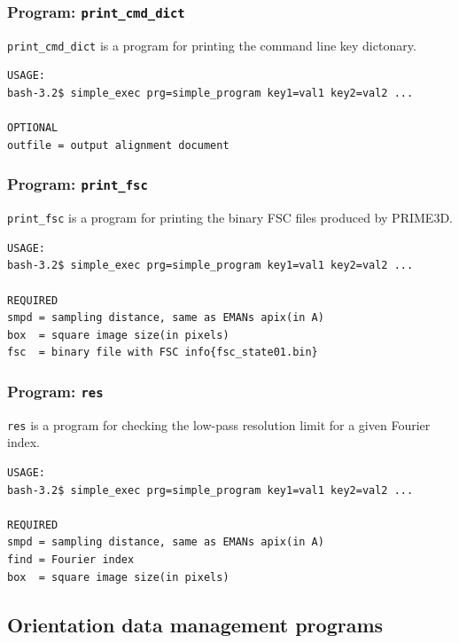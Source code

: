 \documentclass[a4paper,11pt]{article}
\newcommand{\prgname}[1]{\textcolor{NavyBlue}{\texttt{#1}}}
\begin{document}
\subsubsection{Program: \prgname{print\_cmd\_dict}}
\label{print_cmd_dict}
\prgname{print\_cmd\_dict} is a program for printing the command line key dictonary.

\begin{verbatim}
USAGE:
bash-3.2$ simple_exec prg=simple_program key1=val1 key2=val2 ...

OPTIONAL
outfile = output alignment document
\end{verbatim}

\subsubsection{Program: \prgname{print\_fsc}}
\label{print_fsc}
\prgname{print\_fsc} is a program for printing the binary FSC files produced by PRIME3D.

\begin{verbatim}
USAGE:
bash-3.2$ simple_exec prg=simple_program key1=val1 key2=val2 ...

REQUIRED
smpd = sampling distance, same as EMANs apix(in A)
box  = square image size(in pixels)
fsc  = binary file with FSC info{fsc_state01.bin}
\end{verbatim}

\subsubsection{Program: \prgname{res}}
\label{res}
\prgname{res} is a program for checking the low-pass resolution limit for a given Fourier index.

\begin{verbatim}
USAGE:
bash-3.2$ simple_exec prg=simple_program key1=val1 key2=val2 ...

REQUIRED
smpd = sampling distance, same as EMANs apix(in A)
find = Fourier index
box  = square image size(in pixels)
\end{verbatim}

\subsection{Orientation data management programs}
\end{document}
